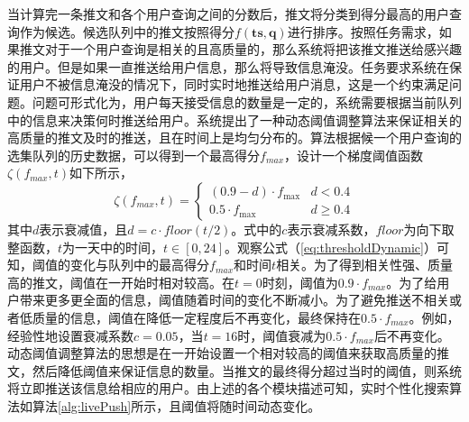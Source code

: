 当计算完一条推文和各个用户查询之间的分数后，推文将分类到得分最高的用户查询作为候选。候选队列中的推文按照得分$f\left( \mathbf{ts}, \mathbf{q} \right)$进行排序。按照任务需求，如果推文对于一个用户查询是相关的且高质量的，那么系统将把该推文推送给感兴趣的用户。但是如果一直推送给用户信息，那么将导致信息淹没。任务要求系统在保证用户不被信息淹没的情况下，同时实时地推送给用户消息，这是一个约束满足问题。问题可形式化为，用户每天接受信息的数量是一定的，系统需要根据当前队列中的信息来决策何时推送给用户。系统提出了一种动态阈值调整算法来保证相关的高质量的推文及时的推送，且在时间上是均匀分布的。算法根据候一个用户查询的选集队列的历史数据，可以得到一个最高得分$f_{max}$，设计一个梯度阈值函数$\zeta\left(f_{max},t\right)$如下所示，
\begin{equation}
\label{eq:thresholdDynamic}
  \zeta\left(f_{max},t\right) = \left\{ {\begin{array}{*{20}{c}}
{(0.9 - d) \cdot {f_{\max }}}&{d < 0.4}\\
{0.5 \cdot {f_{\max }}}&{d \ge 0.4}
\end{array}} \right.
\end{equation}
其中$d$表示衰减值，且$d = c \cdot floor(t/2)$。式中的$c$表示衰减系数，$floor$为向下取整函数，$t$为一天中的时间，$t \in [0,24]$。观察公式（\ref{eq:thresholdDynamic}）可知，阈值的变化与队列中的最高得分$f_{max}$和时间$t$相关。为了得到相关性强、质量高的推文，阈值在一开始时相对较高。在$t=0$时刻，阈值为$0.9 \cdot f_{max}$。为了给用户带来更多更全面的信息，阈值随着时间的变化不断减小。为了避免推送不相关或者低质量的信息，阈值在降低一定程度后不再变化，最终保持在$0.5 \cdot f_{max}$。例如，经验性地设置衰减系数$c=0.05$，当$t=16$时，阈值衰减为$0.5 \cdot f_{max}$后不再变化。动态阈值调整算法的思想是在一开始设置一个相对较高的阈值来获取高质量的推文，然后降低阈值来保证信息的数量。当推文的最终得分超过当时的阈值，则系统将立即推送该信息给相应的用户。由上述的各个模块描述可知，实时个性化搜索算法如算法\ref{alg:livePush}所示，且阈值将随时间动态变化。
